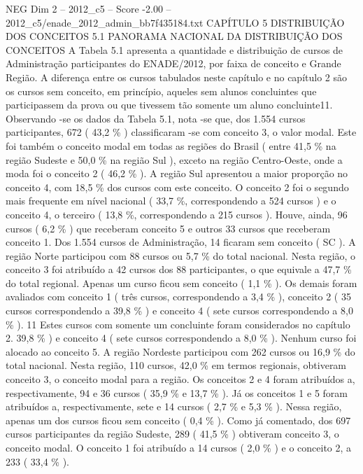\begin{textsample}{NEG Dim 2 – 2012\_c5 – Score -2.00 – 2012\_c5/enade\_2012\_admin\_bb7f435184.txt}  \label{ex:f2_neg_072}
CAPÍTULO 5 DISTRIBUIÇÃO DOS CONCEITOS 5.1 PANORAMA NACIONAL DA DISTRIBUIÇÃO DOS CONCEITOS A Tabela 5.1 apresenta a quantidade e distribuição de cursos de Administração participantes do ENADE/2012, por faixa de conceito e Grande Região.
A diferença entre os cursos tabulados neste capítulo e no capítulo 2 são os cursos sem conceito, em princípio, aqueles sem alunos concluintes que participassem da prova ou que tivessem tão somente um aluno concluinte11.
Observando -se os dados da Tabela 5.1, nota -se que, dos 1.554 cursos participantes, 672 ( 43,2 \% ) classificaram -se com conceito 3, o valor modal.
Este foi também o conceito modal em todas as regiões do Brasil ( entre 41,5 \% na região Sudeste e 50,0 \% na região Sul ), exceto na região Centro-Oeste, onde a moda foi o conceito 2 ( 46,2 \% ).
A região Sul apresentou a maior proporção no conceito 4, com 18,5 \% dos cursos com este conceito.
O conceito 2 foi o segundo mais frequente em nível nacional ( 33,7 \%, correspondendo a 524 cursos ) e o conceito 4, o terceiro ( 13,8 \%, correspondendo a 215 cursos ).
Houve, ainda, 96 cursos ( 6,2 \% ) que receberam conceito 5 e outros 33 cursos que receberam conceito 1.
Dos 1.554 cursos de Administração, 14 ficaram sem conceito ( SC ).
A região Norte participou com 88 cursos ou 5,7 \% do total nacional.
Nesta região, o conceito 3 foi atribuído a 42 cursos dos 88 participantes, o que equivale a 47,7 \% do total regional.
Apenas um curso ficou sem conceito ( 1,1 \% ).
Os demais foram avaliados com conceito 1 ( três cursos, correspondendo a 3,4 \% ), conceito 2 ( 35 cursos correspondendo a 39,8 \% ) e conceito 4 ( sete cursos correspondendo a 8,0 \% ). 11 Estes cursos com somente um concluinte foram considerados no capítulo 2. 39,8 \% ) e conceito 4 ( sete cursos correspondendo a 8,0 \% ).
Nenhum curso foi alocado ao conceito 5.
A região Nordeste participou com 262 cursos ou 16,9 \% do total nacional.
Nesta região, 110 cursos, 42,0 \% em termos regionais, obtiveram conceito 3, o conceito modal para a região.
Os conceitos 2 e 4 foram atribuídos a, respectivamente, 94 e 36 cursos ( 35,9 \% e 13,7 \% ).
Já os conceitos 1 e 5 foram atribuídos a, respectivamente, sete e 14 cursos ( 2,7 \% e 5,3 \% ).
Nessa região, apenas um dos cursos ficou sem conceito ( 0,4 \% ).
Como já comentado, dos 697 cursos participantes da região Sudeste, 289 ( 41,5 \% ) obtiveram conceito 3, o conceito modal.
O conceito 1 foi atribuído a 14 cursos ( 2,0 \% ) e o conceito 2, a 233 ( 33,4 \% ).

\end{textsample}
